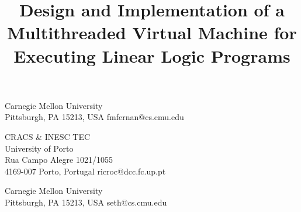 \documentclass{sigplanconf}
\begin{document}
\setlength{\pdfpageheight}{\paperheight}
\setlength{\pdfpagewidth}{\paperwidth}


\exclusivelicense                %


\title{Design and Implementation of a Multithreaded Virtual Machine for Executing Linear Logic Programs}

           {Carnegie Mellon University\\Pittsburgh, PA 15213, USA}
           {fmfernan@cs.cmu.edu}

           {CRACS \& INESC TEC\\University of Porto\\Rua Campo Alegre 1021/1055\\4169-007 Porto, Portugal}
           {ricroc@dcc.fc.up.pt}

           {Carnegie Mellon University\\Pittsburgh, PA 15213, USA}
           {seth@cs.cmu.edu}


\maketitle










\balance




%
\end{document}
